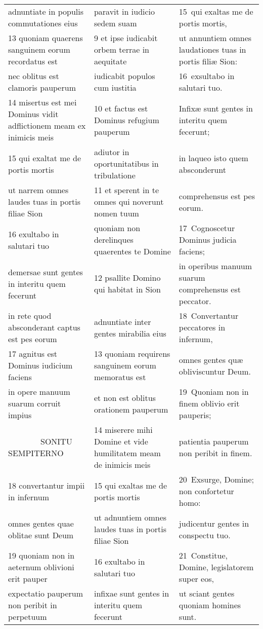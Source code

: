 \documentclass{article}
\begin{document}
\begin{longtable}{@{}p{}p{}p{}@{}}
adnuntiate in populis commutationes eius	&	paravit in iudicio sedem suam	&	15 qui exaltas me de portis mortis,	\\
13 quoniam quaerens sanguinem eorum recordatus est	&	9 et ipse iudicabit orbem terrae in aequitate	&	ut annuntiem omnes laudationes tuas in portis filiæ Sion:	\\
nec oblitus est clamoris pauperum	&	iudicabit populos cum iustitia	&	16 exsultabo in salutari tuo.	\\
14 misertus est mei Dominus vidit adflictionem meam ex inimicis meis	&	10 et factus est Dominus refugium pauperum	&	Infixæ sunt gentes in interitu quem fecerunt;	\\
15 qui exaltat me de portis mortis	&	adiutor in oportunitatibus in tribulatione	&	in laqueo isto quem absconderunt	\\
ut narrem omnes laudes tuas in portis filiae Sion	&	11 et sperent in te omnes qui noverunt nomen tuum	&	comprehensus est pes eorum.	\\
16 exultabo in salutari tuo	&	quoniam non derelinques quaerentes te Domine	&	17 Cognoscetur Dominus judicia faciens;	\\
demersae sunt gentes in interitu quem fecerunt	&	12 psallite Domino qui habitat in Sion	&	in operibus manuum suarum comprehensus est peccator.	\\
in rete quod absconderant captus est pes eorum	&	adnuntiate inter gentes mirabilia eius	&	18 Convertantur peccatores in infernum,	\\
17 agnitus est Dominus iudicium faciens	&	13 quoniam requirens sanguinem eorum memoratus est	&	omnes gentes quæ obliviscuntur Deum.	\\
in opere manuum suarum corruit impius	&	et non est oblitus orationem pauperum	&	19 Quoniam non in finem oblivio erit pauperis;	\\
    SONITU SEMPITERNO	&	14 miserere mihi Domine et vide humilitatem meam de inimicis meis	&	patientia pauperum non peribit in finem.	\\
18 convertantur impii in infernum	&	15 qui exaltas me de portis mortis	&	20 Exsurge, Domine; non confortetur homo:	\\
omnes gentes quae oblitae sunt Deum	&	ut adnuntiem omnes laudes tuas in portis filiae Sion	&	judicentur gentes in conspectu tuo.	\\
19 quoniam non in aeternum oblivioni erit pauper	&	16 exultabo in salutari tuo	&	21 Constitue, Domine, legislatorem super eos,	\\
expectatio pauperum non peribit in perpetuum	&	infixae sunt gentes in interitu quem fecerunt	&	ut sciant gentes quoniam homines sunt.	\\

\end{longtable}
\end{document}
